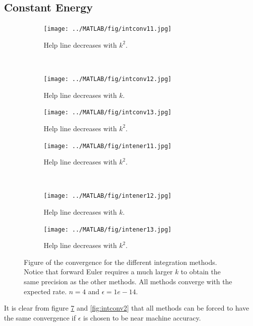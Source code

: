 \subsection{Constant Energy}%
\begin{figure}[H]
        \centering
        \begin{subfigure}[b]{0.30\textwidth}
                \texttt{[image: ../MATLAB/fig/intconv11.jpg]}
                \caption{ Help line decreases with $k^2$. }
                \label{fig:intconv11}
        \end{subfigure}
        ~
        \begin{subfigure}[b]{0.30\textwidth}
                \texttt{[image: ../MATLAB/fig/intconv12.jpg]}
                \caption{ Help line decreases with $k$. }
                \label{fig:intconv12}
        \end{subfigure}
        \begin{subfigure}[b]{0.30\textwidth}
                \texttt{[image: ../MATLAB/fig/intconv13.jpg]}
                \caption{ Help line decreases with $k^2$. }
                \label{fig:intconv13}
        \end{subfigure}
        
        \begin{subfigure}[b]{0.30\textwidth}
                \texttt{[image: ../MATLAB/fig/intener11.jpg]}
                \caption{ Help line decreases with $k^2$. }
                \label{fig:intener11}
        \end{subfigure}
        ~
        \begin{subfigure}[b]{0.30\textwidth}
                \texttt{[image: ../MATLAB/fig/intener12.jpg]}
                \caption{ Help line decreases with $k$. }
                \label{fig:intener12}
        \end{subfigure}
        \begin{subfigure}[b]{0.30\textwidth}
                \texttt{[image: ../MATLAB/fig/intener13.jpg]}
                \caption{ Help line decreases with $k^2$. }
                \label{fig:intener13}
        \end{subfigure}        
        
\caption{Figure of the convergence for the different integration methods. Notice that forward Euler requires a much larger $k$ to obtain the same precision as the other methods. All methods converge with the expected rate. $n = 4$ and $\epsilon  = 1e-14$.}
\label{fig:intconv}
\end{figure}
It is clear from figure \ref{fig:intconv} and \ref{fig:intconv2} that all methods can be forced to have the same convergence if $\epsilon$ is chosen to be near machine accuracy.


